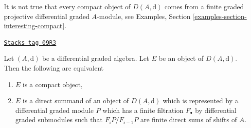 It is not true that every compact object of $D(A, \text{d})$ comes
from a finite graded projective differential graded $A$-module,
see Examples, Section \ref{examples-section-interesting-compact}.

\begin{proposition}[Compact]
\label{dga-proposition-compact}
\href{https://stacks.math.columbia.edu/tag/09R3}{\texttt{Stacks tag 09R3}}

Let $(A, \text{d})$ be a differential graded algebra. Let $E$ be an
object of $D(A, \text{d})$. Then the following are equivalent
\begin{enumerate}
\item $E$ is a compact object,
\item $E$ is a direct summand of an object of $D(A, \text{d})$
which is represented by a differential graded module $P$ which
has a finite filtration $F_\bullet$ by differential graded submodules
such that $F_iP/F_{i - 1}P$ are finite direct sums of shifts of $A$.
\end{enumerate}
\end{proposition}

